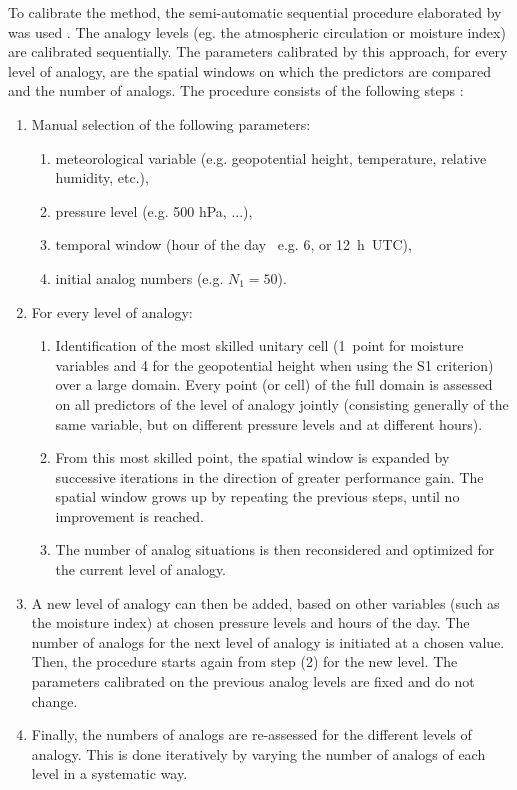 \documentclass[hess, manuscript]{copernicus}
\begin{document}
To calibrate the method, the semi-automatic sequential procedure elaborated by \citet{Bontron2004} was used \cite[see also ][]{Horton2012a, Radanovics2013, BenDaoud2016}. The analogy levels (eg. the atmospheric circulation or moisture index) are calibrated sequentially. The parameters calibrated by this approach, for every level of analogy, are the spatial windows on which the predictors are compared and the number of analogs. The procedure consists of the following steps \citep{Bontron2004}:

\begin{enumerate}
	\item Manual selection of the following parameters:
	\begin{enumerate}
		\item meteorological variable (e.g. geopotential height, temperature, relative humidity, etc.),
		\item pressure level (e.g. 500 hPa, ...),
		\item temporal window (hour of the day \textendash\ e.g. 6, or 12~h~UTC),
		\item initial analog numbers (e.g. $N_{1}=50$).
	\end{enumerate}
	
	\item For every level of analogy:
	\begin{enumerate}
		\item Identification of the most skilled unitary cell (1~point for moisture variables and 4 for the geopotential height when using the S1 criterion) over a large domain. Every point (or cell) of the full domain is assessed on all predictors of the level of analogy jointly (consisting generally of the same variable, but on different pressure levels and at different hours).
		\item From this most skilled point, the spatial window is expanded by successive iterations in the direction of greater performance gain. The spatial window grows up by repeating the previous steps, until no improvement is reached.
		\item The number of analog situations is then reconsidered and optimized for the current level of analogy.
	\end{enumerate}
	\item A new level of analogy can then be added, based on other variables (such as the moisture index) at chosen pressure levels and hours of the day. The number of analogs for the next level of analogy is initiated at a chosen value. Then, the procedure starts again from step (2) for the new level. The parameters calibrated on the previous analog levels are fixed and do not change. 
	\item Finally, the numbers of analogs are re-assessed for the different levels of analogy. This is done iteratively by varying the number of analogs of each level in a systematic way.
\end{enumerate}
\end{document}
